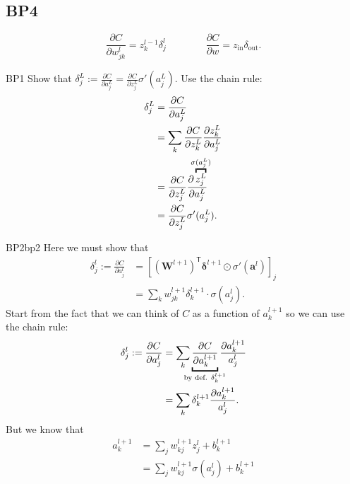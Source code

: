 \documentclass[a4paper,9pt]{extarticle}
\begin{document}
\begin{multicols*}{2}
		\subsection{BP4}
		\begin{equation*}
			\frac{\partial C}{\partial w_{jk}^{l}}=z_{k}^{l-1}\delta_{j}^{l}\qquad\qquad\frac{\partial C}{\partial w}=z_{\text{in}}\delta_{\text{out}}.
		\end{equation*}
		\begin{myproof}{\color{Turquoise4!80!black}BP1}{}
			Show that $\delta^{L}_{j}:=\frac{\partial C}{\partial a^{L}_{j}}=\frac{\partial C}{\partial z^{L}_{j}}\sigma'(a^{L}_{j})$. Use the chain rule:
			\begin{align*}
				\delta^{L}_{j}&=\frac{\partial C}{\partial a^{L}_{j}}\\
				&=\sum_{k}\frac{\partial C}{\partial z^{L}_{k}}\frac{\partial z^{L}_{k}}{\partial a^{L}_{j}}\\
				&=\frac{\partial C}{\partial z^{L}_{j}}\frac{\partial \overbracket{z^{L}_{j}}^{\mathclap{\sigma(a^{L}_{j})}}}{\partial a^{L}_{j}}\\
				&=\frac{\partial C}{\partial z^{L}_{j}}\sigma'(a^{L}_{j}).
			\end{align*}
		\end{myproof}
		\begin{myproof}{\color{Turquoise4!80!black}BP2}{bp2}
			Here we must show that 
			\begin{align*}
				\delta^{l}_{j}:=\frac{\partial C}{\partial a^{l}_{j}}&={\left[(\mathbf{W}^{l+1})^{\mathsf{T}}\boldsymbol{\delta}^{l+1}\odot\sigma'(\mathbf{a}^{l})\right]}_{j}\\
				&=\sum_{k}w_{jk}^{l+1}\delta_{k}^{l+1}\cdot\sigma(a^{l}_{j}).
			\end{align*}
			Start from the fact that we can think of $C$ as a function of $a^{l+1}_{k}$ so we can use the chain rule:
			\begin{align*}
				\delta^{l}_{j}:=\frac{\partial C}{\partial a_{j}^{l}}&=\sum_{k}\underbracket{\frac{\partial C}{\partial a^{l+1}_{k}}}_{\mathclap{\text{by def. }\delta_{k}^{l+1}}}\frac{\partial a^{l+1}_{k}}{a^{l}_{j}}\\
				&=\sum_{k}\delta_{k}^{l+1}\frac{\partial a^{l+1}_{k}}{a^{l}_{j}}.
			\end{align*}
			But we know that
			\begin{align*}
				a^{l+1}_{k}&=\sum_{j}w_{kj}^{l+1}z^{l}_{j}+b^{l+1}_{k}\\
				&=\sum_{j}w_{kj}^{l+1}\sigma(a^{l}_{j})+b^{l+1}_{k}

\end{align*}
\end{myproof}
\end{multicols*}
\end{document}
